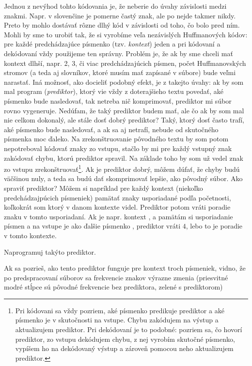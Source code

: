 Jednou z nevýhod tohto kódovania je, že neberie do úvahy závislosti medzi znakmi. 
Napr. v slovenčine je  pomerne častý znak, ale po  nejde takmer nikdy.
Preto  by mohlo dostávať rôzne dlhý kód v závislosti od toho, čo bolo pred ním.
Mohli by sme to urobiť tak, že si vyrobíme veľa nezávislých Huffmanových kódov: pre každé
predchádzajúce písmenko (tzv. {\em kontext}) jeden a pri kódovaní a dekódovaní
vždy použijeme ten správny. Problém je, že ak by sme chceli mať kontext dlhší, napr.
2, 3, či viac predchádzajúcich písmen, počet Huffmanovských stromov (a teda aj slovníkov, ktoré musím mať zapísané v súbore) bude veľmi narastať. 
Iná možnosť, ako docieliť podobný efekt, je z takejto úvahy: ak by som mal program 
({\em prediktor}), ktorý
vie vždy z doterajšieho textu povedať, aké písmenko bude nasledovať, tak netreba nič 
komprimovať, prediktor mi súbor rovno vygeneruje.
Nedúfam, že taký prediktor budem mať, ale čo ak by som 
mal nie celkom dokonalý, ale stále dosť dobrý prediktor? Taký, ktorý dosť často trafí, aké písmenko
bude nasledovať, a ak sa aj netrafí, nebude od skutočného písmenka moc ďaleko. Na zrekonštruovanie pôvodného
textu by som potom nepotreboval kódovať znaky zo vstupu, stačlo by mi pre každý vstupný znak zakódovať chybu, ktorú prediktor spravil. Na základe toho 
by som už vedel znak zo vstupu zrekonštruovať\footnote{%
 Pri kódovani sa vždy pozriem, aké písmenko predikuje prediktor a aké písmenko je v skutočnosti na vstupe. Chybu zakódujem na výstup a aktualizujem prediktor.
 Pri dekódovaní je to podobné: pozriem sa, čo hovorí prediktor, zo vstupu dekódujem chybu, z nej vyrobím skutočné písmenko, vypíšem ho na dekódovaný výstup a
 zároveň pomocou neho aktualizujem prediktor.
}. 
Ak je prediktor dobrý,
môžem dúfať, že chyby budú väčšinou nuly, a teda sa budú dať skomprimovať lepšie, ako 
pôvodný súbor. Ako spraviť prediktor? Môžem si napríklad pre každý kontext (niekoľko predchádzajpúcich písmeniek)
pamätať znaky usporiadané podľa početnosti, koľkokrát som ktorý v danom kontexte videl.
Prediktor potom vráti poradie znaku v tomto usporiadaní. Ak je napr. kontext ,
a pamätám si usporiadanie písmen  a na vstupe je ako
ďalšie písmenko , prediktor vráti $4$, lebo to je poradie  v tomto kontexte.

\begin{uloha}
  Naprogramuj takýto prediktor.
\end{uloha}

Ak sa pozrieš, ako tento prediktor funguje pre kontext troch písmeniek, vidno, že po 
predspracovaní súborov sa frekvencie znakov výrazne zmenia (priesvitné modré stĺpce
sú pôvodné frekvencie bez prediktora, zelené s prediktorom)

